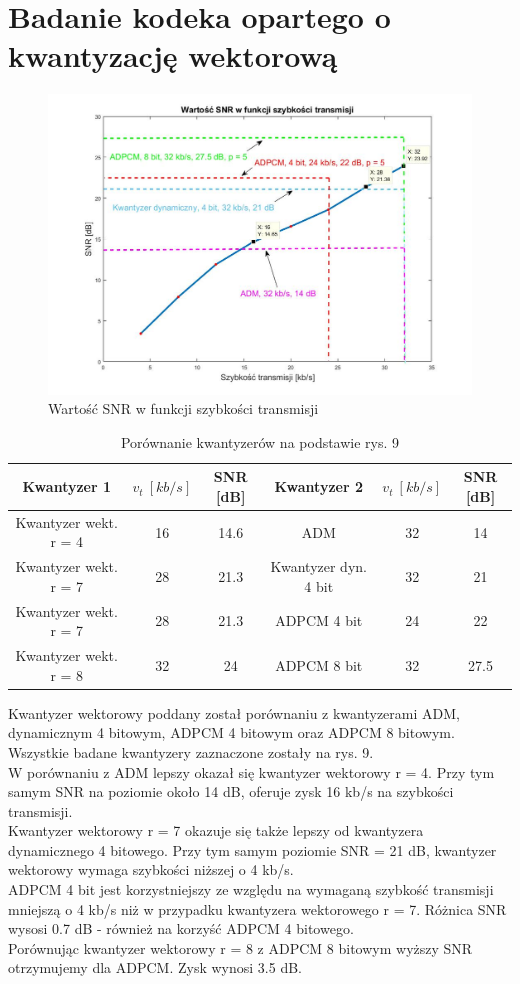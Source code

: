 \documentclass[12pt, a4paper, oneside]{article}
\begin{document}
\section{Badanie kodeka opartego o kwantyzację wektorową}
\begin{figure}[h!]
\centering
\caption{Wartość SNR w funkcji szybkości transmisji}
\includegraphics[scale=0.5]{pics/f9}
\end{figure}
\begin{table}[h!]
  \centering
  \caption{Porównanie kwantyzerów na podstawie rys. 9}
    \begin{tabular}{|c|c|c|c|c|c|}\hline
    Kwantyzer 1 & $v_t~[kb/s]$ & SNR [dB] & Kwantyzer 2 & $v_t~[kb/s]$ & SNR [dB] \\\hline
    Kwantyzer wekt. r = 4 & 16 & 14.6 & ADM & 32 & 14 \\\hline
    Kwantyzer wekt. r = 7 & 28 & 21.3 & Kwantyzer dyn. 4 bit & 32 & 21 \\\hline
    Kwantyzer wekt. r = 7 & 28 & 21.3 & ADPCM 4 bit & 24 & 22 \\\hline
    Kwantyzer wekt. r = 8 & 32 & 24 & ADPCM 8 bit & 32 & 27.5 \\\hline
    \end{tabular}%
  \label{tab:addlabel}%
\end{table}%
Kwantyzer wektorowy poddany został porównaniu z kwantyzerami ADM, dynamicznym 4 bitowym, ADPCM 4 bitowym oraz ADPCM 8 bitowym. Wszystkie badane kwantyzery zaznaczone zostały na rys. 9.\\
\indent W porównaniu z ADM lepszy okazał się kwantyzer wektorowy r = 4. Przy tym samym SNR na poziomie około 14 dB, oferuje zysk 16 kb/s na szybkości transmisji.\\
\indent Kwantyzer wektorowy r = 7 okazuje się także lepszy od kwantyzera dynamicznego 4 bitowego. Przy tym samym poziomie SNR = 21 dB, kwantyzer wektorowy wymaga szybkości niższej o 4 kb/s.\\
\indent ADPCM 4 bit jest korzystniejszy ze względu na wymaganą szybkość transmisji mniejszą o 4 kb/s niż w przypadku kwantyzera wektorowego r = 7. Różnica SNR wysosi 0.7 dB - również na korzyść ADPCM 4 bitowego.\\
\indent Porównując kwantyzer wektorowy r = 8 z ADPCM 8 bitowym wyższy SNR otrzymujemy dla ADPCM. Zysk wynosi 3.5 dB.
\clearpage
\end{document}
